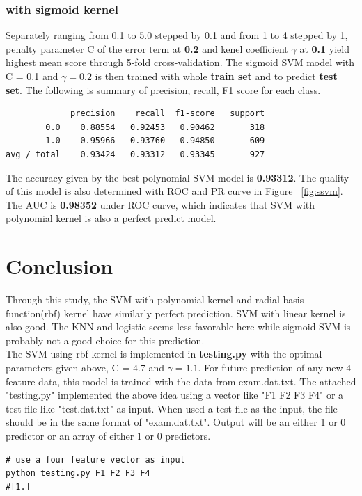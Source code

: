 \documentclass{article}
\begin{document}
\begin{singlespacing}
\subsubsection{with sigmoid kernel}
Separately ranging from 0.1 to 5.0 stepped by 0.1 and from 1 to 4 stepped by 1, penalty parameter C of the error term at \textbf{0.2} and kenel coefficient $\gamma$ at \textbf{0.1} yield highest mean score through 5-fold cross-validation. The sigmoid SVM model with C = 0.1 and $\gamma = 0.2 $ is then trained with  whole \textbf{train set} and to predict \textbf{test set}. The following is summary of precision, recall, F1 score for each class.
\begin{lstlisting}
             precision    recall  f1-score   support
        0.0    0.88554   0.92453   0.90462       318
        1.0    0.95966   0.93760   0.94850       609
avg / total    0.93424   0.93312   0.93345       927
\end{lstlisting}
The accuracy given by the best polynomial SVM model is \textbf{0.93312}. The quality of this model is also determined with ROC and PR curve in Figure ~\ref{fig:ssvm}. The AUC is \textbf{0.98352} under ROC curve, which indicates that SVM with polynomial kernel is also a perfect predict model.

\section{Conclusion}
Through this study, the SVM with polynomial kernel and radial basis function(rbf) kernel have similarly perfect prediction. SVM with linear kernel is also good. The KNN and logistic seems less favorable here while sigmoid SVM is probably not a good choice for this prediction.\\

\noindent The SVM using rbf kernel is implemented in \textbf{testing.py} with the optimal parameters given above, C = 4.7 and $\gamma = 1.1$. For future prediction of any new 4-feature data, this model is trained with the data from exam.dat.txt. The attached "testing.py" implemented the above idea using a vector like "F1 F2 F3 F4" or a test file like "test.dat.txt" as input. When used a test file as the input, the file should be in the same format of "exam.dat.txt". Output will be an either 1 or 0 predictor or an array of either 1 or 0 predictors.

\begin{lstlisting}
# use a four feature vector as input
python testing.py F1 F2 F3 F4
#[1.]


\end{lstlisting}
\end{singlespacing}
\end{document}
